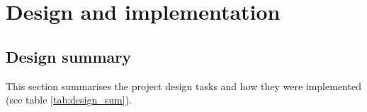 \newpage



\section{Design and implementation}

\subsection{Design summary}

This section summarises the project design tasks and how they were implemented (see table \ref{tab:design_sum}).

